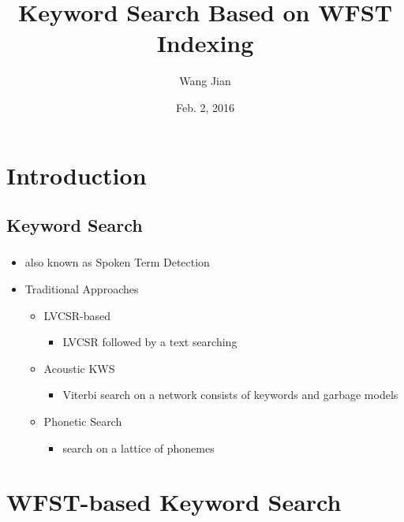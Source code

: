 \documentclass{beamer}
\title{Keyword Search Based on WFST Indexing}
\author{Wang Jian}
\date{Feb. 2, 2016}
\begin{document}

\frame{\titlepage}

\section[Outline]{}
\frame{\tableofcontents}

\section{Introduction}
\subsection{Keyword Search}
\frame
{
  \frametitle{\subsecname}
  
  \begin{itemize}
  \item{also known as Spoken Term Detection}

  \item{Traditional Approaches}
  
      \begin{itemize}
      \item{LVCSR-based} 
        \begin{itemize}
        \item{LVCSR followed by a text searching}
         \end{itemize}
         
      \item{Acoustic KWS} 
        \begin{itemize}
        \item{Viterbi search on a network consists of keywords and garbage models}
         \end{itemize}
      
      \item{Phonetic Search} 
        \begin{itemize}
        \item{search on a lattice of phonemes}
         \end{itemize}
            
      \end{itemize}

  \end{itemize}
}

\section{WFST-based Keyword Search}
\end{document}
